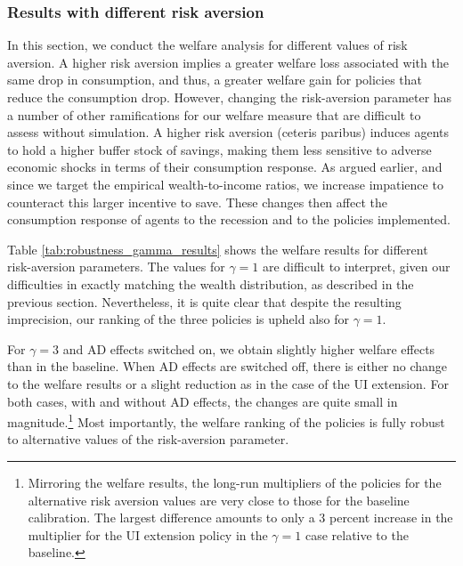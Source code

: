 \documentclass[\econtexRoot/HAFiscal]{subfiles}
\begin{document}
\subsubsection{Results with different risk aversion}
\notinsubfile{\label{sec:robust_gamma_results}}

In this section, we conduct the welfare analysis for different values of risk aversion. A higher risk aversion implies a greater welfare loss associated with the same drop in consumption, and thus, a greater welfare gain for policies that reduce the consumption drop. However, changing the risk-aversion parameter has a number of other ramifications for our welfare measure that are difficult to assess without simulation. A higher risk aversion (ceteris paribus) induces agents to hold a higher buffer stock of savings, making them less sensitive to adverse economic shocks in terms of their consumption response. As argued earlier, and since we target the empirical wealth-to-income ratios, we increase impatience to counteract this larger incentive to save. These changes then affect the consumption response of agents to the recession and to the policies implemented. 

Table \ref{tab:robustness_gamma_results} shows the welfare results for different risk-aversion parameters. The values for $\gamma = 1$ are difficult to interpret, given our difficulties in exactly matching the wealth distribution, as described in the previous section. Nevertheless, it is quite clear that despite the resulting imprecision, our ranking of the three policies is upheld also for $\gamma=1$.

For $\gamma=3$ and AD effects switched on, we obtain slightly higher welfare effects than in the baseline. When AD effects are switched off, there is either no change to the welfare results or a slight reduction as in the case of the UI extension. For both cases, with and without AD effects, the changes are quite small in magnitude.\footnote{Mirroring the welfare results, the long-run multipliers of the policies for the alternative risk aversion values are very close to those for the baseline calibration. The largest difference amounts to only a 3 percent increase in the multiplier for the UI extension policy in the $\gamma = 1$ case relative to the baseline.} Most importantly, the welfare ranking of the policies is fully robust to alternative values of the risk-aversion parameter.
\end{document}
